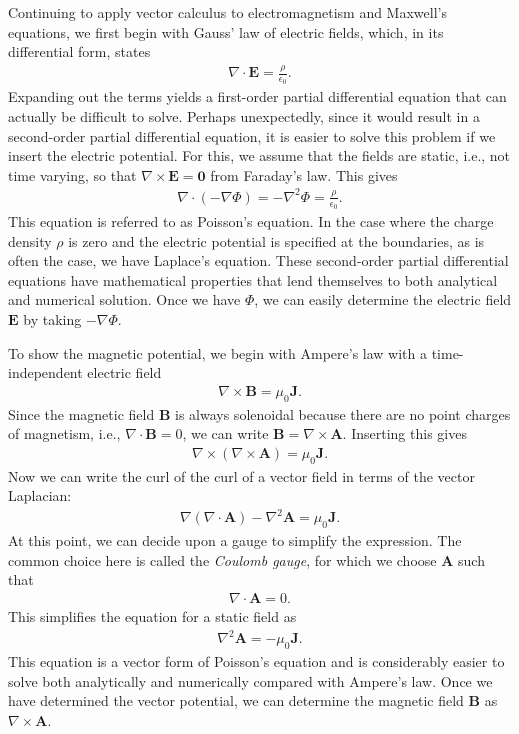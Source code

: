 Continuing to apply vector calculus to electromagnetism and Maxwell's equations, we first begin with Gauss' law of electric fields, which, in its differential form, states
\begin{align}
  \nabla \cdot \mathbf{E} = \frac{\rho}{\epsilon_0} . \nonumber
\end{align}
Expanding out the terms yields a first-order partial differential equation that can actually be difficult to solve. Perhaps unexpectedly, since it would result in a second-order partial differential equation, it is easier to solve this problem if we insert the electric potential. For this, we assume that the fields are static, i.e., not time varying, so that $\nabla \times \mathbf{E} = \mathbf{0}$ from Faraday's law. This gives
\begin{align}
  \nabla \cdot (-\nabla \Phi) = -\nabla^2 \Phi = \frac{\rho}{\epsilon_0} .
\end{align}
This equation is referred to as Poisson's equation. In the case where the charge density $\rho$ is zero and the electric potential is specified at the boundaries, as is often the case, we have Laplace's equation. These second-order partial differential equations have mathematical properties that lend themselves to both analytical and numerical solution. Once we have $\Phi$, we can easily determine the electric field $\mathbf{E}$ by taking $-\nabla \Phi$.

To show the magnetic potential, we begin with Ampere's law with a time-independent electric field
\begin{align}
  \nabla \times \mathbf{B} = \mu_0 \mathbf{J} . \nonumber
\end{align}
Since the magnetic field $\mathbf{B}$ is always solenoidal because there are no point charges of magnetism, i.e., $\nabla \cdot \mathbf{B} = 0$, we can write $\mathbf{B} = \nabla \times \mathbf{A}$. Inserting this gives
\begin{align}
  \nabla \times ( \nabla \times \mathbf{A} ) = \mu_0 \mathbf{J} . 
\end{align}
Now we can write the curl of the curl of a vector field in terms of the vector Laplacian:
\begin{align}
  \nabla ( \nabla \cdot \mathbf{A} ) - \nabla^2 \mathbf{A} = \mu_0 \mathbf{J} . 
\end{align}
At this point, we can decide upon a gauge to simplify the expression. The common choice here is called the \emph{Coulomb gauge}, for which we choose $\mathbf{A}$ such that 
\begin{align}
  \nabla \cdot \mathbf{A} = 0.
\end{align}
This simplifies the equation for a static field as
\begin{align}
  \nabla^2 \mathbf{A} = -\mu_0 \mathbf{J} . 
\end{align}
This equation is a vector form of Poisson's equation and is considerably easier to solve both analytically and numerically compared with Ampere's law. Once we have determined the vector potential, we can determine the magnetic field $\mathbf{B}$ as $\nabla \times \mathbf{A}$.

